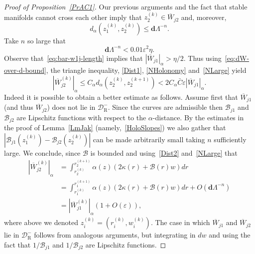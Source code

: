 \documentclass[10pt]{amsart}
\theoremstyle{definition}\newtheorem{defi}[theo]{Definition}\newtheorem{rema}[theo]{Remark}\newtheorem{exam}[theo]{Example}\newtheorem{exem}[theo]{Example}\newtheorem{nota}[theo]{Notation}
\newcommand{\eps}{\varepsilon}
\newcommand{\ct}{r}
\newcommand{\bd}{\mathbf{d}}
\newcommand{\cB}{\mathcal{B}}
\newcommand{\pslope}{\mathcal{B}}
\newcommand{\cell}{\mathcal{D}}
\newcommand{\brW}{\overline{W}}
\newcommand{\recoPrivate}{\mathrm{R}}
\newcommand{\reco}{{\cell^-_{\recoPrivate}}}
\newcommand{\dadm}[1]{\dadmPrivate^{#1}}
\newcommand{\dadmPrivate}{d\adm}
\newcommand{\ppPrivate}[2]{#1^{#2}}
\newcommand{\prePrivate}[1]{\ppPrivate{#1}{-}}
\newcommand{\prpslope}{\prePrivate{\pslope}}
\newcommand{\adm}{_{\alpha^{+}}}
\newcommand{\admName}{\alpha^{+}}
\renewcommand{\admName}{\alpha}
\renewcommand{\adm}{_{\alpha}}
\renewcommand{\prpslope}{\cB}
\renewcommand{\prpslope}{\cB}
\renewcommand{\prpslope}{\cB}
\renewcommand{\dadm}{d\adm}
\begin{document}
\begin{proof}[Proof of Proposition~\ref{PrAC1}]
Our previous arguments and the fact that stable manifolds cannot cross each other imply that $z_{2}^{(k)}\in\brW_{j2}$ and, moreover,
\begin{equation}\label{NHolonomy}
\dadm\left(z_{1}^{(k)},z_{2}^{(k)}\right) \le \bd\Lambda^{-n}.
\end{equation}
Take $n$ so large that
\begin{equation}\label{NLarge}
\bd\Lambda^{-n}<0.01\eps^2 \eta.
\end{equation}
Observe that~\eqref{eq:bar-w1j-length} implies that $|\brW_{j1}|\adm > \eta/2$. Thus using~\eqref{eq:dW-over-d-bound}, the triangle inequality, \eqref{Dist1}, \eqref{NHolonomy} and~\eqref{NLarge} yield
\begin{equation}\label{Dist2}
\left|\brW_{j2}^{(k)}\right|\adm
\le C_{\alpha} \dadm\left(z_{2}^{(k)},z_{2}^{(k+1)}\right) < 2 C_{\alpha} \bar C\eps|\brW_{j1}|\adm.
\end{equation}
Indeed it is possible to obtain a better estimate as follows. Assume first that $\brW_{j1}$ (and thus $\brW_{j2}$) does not lie in $\reco$. Since the curves are admissible then $\prpslope_{j1}$ and $\prpslope_{j2}$ are Lipschitz functions with respect to the $\admName$-distance. By the estimates in the proof of Lemma~\ref{LmJak} (namely,~\eqref{HoloSlopes}) we also gather that $|\prpslope_{j1}(z_{1}^{(k)}) - \prpslope_{j2}(z_{2}^{(k)})|$ can be made arbitrarily small taking $n$ sufficiently large. We conclude, since $\prpslope$ is bounded and using~\eqref{Dist2} and~\eqref{NLarge} that
\begin{equation}\label{Dist2_better}
\begin{split}
\left|\brW_{j2}^{(k)}\right|\adm & = 
\int_{\ct_{2}^{(k)}}^{\ct_{2}^{(k+1)}} \alpha(z)(2\kappa(r)+\prpslope(r)w) d\ct \\
& =  {\int_{\ct_{1}^{(k)}}^{\ct_{1}^{(k+1)}}} \alpha(z)(2\kappa(r)+\prpslope(r)w) d\ct+O(\bd \Lambda^{-n})\\
&  =  \left|\brW_{j1}^{(k)}\right|\adm(1+O(\eps)),
\end{split}
\end{equation}
where above we denoted $z_{i}^{(k)} = (r_{i}^{(k)},w_{i}^{(k)})$. The case in which $\brW_{j1}$ and $\brW_{j2}$ lie in $\reco$ follows from analogous arguments, but integrating in $dw$ and using the fact that $1/\prpslope_{j1}$ and $1/\prpslope_{j2}$ are Lipschitz functions.



\end{proof}
\end{document}
